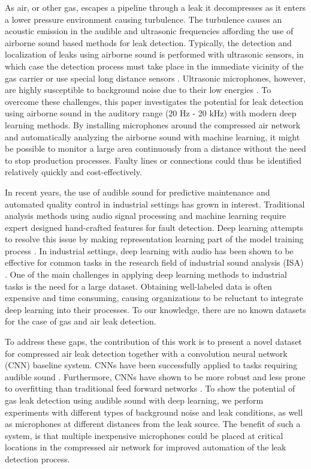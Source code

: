 \documentclass[a4paper,12pt]{article}
\begin{document}
As air, or other gas, escapes a pipeline through a leak it decompresses as it enters a lower pressure environment causing turbulence. The turbulence causes an acoustic emission in the audible and ultrasonic frequencies affording the use of airborne sound based methods for leak detection\cite{Genuit.2010, Eret2012:beamform}.
Typically, the detection and localization of leaks using airborne sound is performed with ultrasonic sensors, in which case the detection process must take place in the immediate vicinity of the gas carrier or use special long distance sensors \cite{Chen.2007}. Ultrasonic microphones, however, are highly susceptible to background noise due to their low energies \cite{Eret2012:beamform}.
To overcome these challenges, this paper investigates the potential for leak detection using airborne sound in the auditory range (20 Hz - 20 kHz) with modern deep learning methods. By installing microphones around the compressed air network and automatically analyzing the airborne sound with machine learning, it might be possible to monitor a large area continuously from a distance without the need to stop production processes. Faulty lines or connections could thus be identified relatively quickly and cost-effectively. 

In recent years, the use of audible sound for predictive maintenance and automated quality control in industrial settings has grown in interest. Traditional analysis methods using audio signal processing and machine learning require expert designed hand-crafted features for fault detection. Deep learning attempts to resolve this issue by making representation learning part of the model training process \cite{Lecun2015:deep}. In industrial settings, deep learning with audio has been shown to be effective for common tasks in the research field of industrial sound analysis (ISA) \cite{Grollmisch2019:isa, Grollmisch2020:pucks, Johnson2020:robust, Grollmisch2020:embeddings}. One of the main challenges in applying deep learning methods to industrial tasks is the need for a large dataset. Obtaining well-labeled data is often expensive and time consuming, causing organizations to be reluctant to integrate deep learning into their processes. To our knowledge, there are no known datasets for the case of gas and air leak detection.

To address these gaps, the contribution of this work is to present a novel dataset for compressed air leak detection together with a convolution neural network (CNN) baseline system. CNNs have been successfully applied to tasks requiring audible sound \cite{Hershey2017:audiocnn, Grollmisch2020:pucks}. Furthermore, CNNs have shown to be more robust and less prone to overfitting than traditional feed forward networks \cite{Johnson2020:robust}. To show the potential of gas leak detection using audible sound with deep learning, we perform experiments with different types of background noise and leak conditions, as well as microphones at different distances from the leak source. The benefit of such a system, is that multiple inexpensive microphones could be placed at critical locations in the compressed air network for improved automation of the leak detection process.
\end{document}
